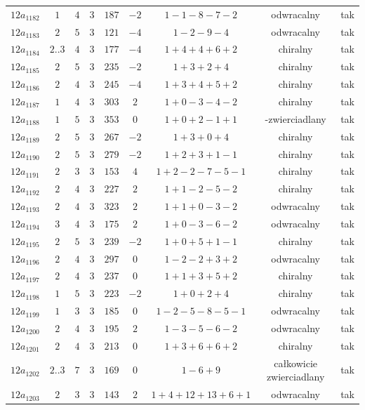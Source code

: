 \begin{longtable}{ccccccccc}
$12a_{1182}$ & $1$ & $4$ & $3$ & $187$ & $-2$ & $1-1-8-7-2$ & odwracalny & tak \\
$12a_{1183}$ & $2$ & $5$ & $3$ & $121$ & $-4$ & $1-2-9-4$ & odwracalny & tak \\
$12a_{1184}$ & $2..3$ & $4$ & $3$ & $177$ & $-4$ & $1+4+4+6+2$ & chiralny & tak \\
$12a_{1185}$ & $2$ & $5$ & $3$ & $235$ & $-2$ & $1+3+2+4$ & chiralny & tak \\
$12a_{1186}$ & $2$ & $4$ & $3$ & $245$ & $-4$ & $1+3+4+5+2$ & chiralny & tak \\
$12a_{1187}$ & $1$ & $4$ & $3$ & $303$ & $2$ & $1+0-3-4-2$ & chiralny & tak \\
$12a_{1188}$ & $1$ & $5$ & $3$ & $353$ & $0$ & $1+0+2-1+1$ & -zwierciadlany & tak \\
$12a_{1189}$ & $2$ & $5$ & $3$ & $267$ & $-2$ & $1+3+0+4$ & chiralny & tak \\
$12a_{1190}$ & $2$ & $5$ & $3$ & $279$ & $-2$ & $1+2+3+1-1$ & chiralny & tak \\
$12a_{1191}$ & $2$ & $3$ & $3$ & $153$ & $4$ & $1+2-2-7-5-1$ & chiralny & tak \\
$12a_{1192}$ & $2$ & $4$ & $3$ & $227$ & $2$ & $1+1-2-5-2$ & chiralny & tak \\
$12a_{1193}$ & $2$ & $4$ & $3$ & $323$ & $2$ & $1+1+0-3-2$ & odwracalny & tak \\
$12a_{1194}$ & $3$ & $4$ & $3$ & $175$ & $2$ & $1+0-3-6-2$ & odwracalny & tak \\
$12a_{1195}$ & $2$ & $5$ & $3$ & $239$ & $-2$ & $1+0+5+1-1$ & chiralny & tak \\
$12a_{1196}$ & $2$ & $4$ & $3$ & $297$ & $0$ & $1-2-2+3+2$ & odwracalny & tak \\
$12a_{1197}$ & $2$ & $4$ & $3$ & $237$ & $0$ & $1+1+3+5+2$ & chiralny & tak \\
$12a_{1198}$ & $1$ & $5$ & $3$ & $223$ & $-2$ & $1+0+2+4$ & chiralny & tak \\
$12a_{1199}$ & $1$ & $3$ & $3$ & $185$ & $0$ & $1-2-5-8-5-1$ & odwracalny & tak \\
$12a_{1200}$ & $2$ & $4$ & $3$ & $195$ & $2$ & $1-3-5-6-2$ & odwracalny & tak \\
$12a_{1201}$ & $2$ & $4$ & $3$ & $213$ & $0$ & $1+3+6+6+2$ & chiralny & tak \\
$12a_{1202}$ & $2..3$ & $7$ & $3$ & $169$ & $0$ & $1-6+9$ & całkowicie zwierciadlany & tak \\
$12a_{1203}$ & $2$ & $3$ & $3$ & $143$ & $2$ & $1+4+12+13+6+1$ & odwracalny & tak \\

\end{longtable}
